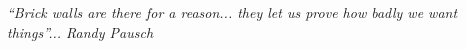 \documentclass[a4paper, 11pt, oneside]{Thesis}  %
\begin{document}
%
%
%
% 
% 
% 
% 
% 
% 
% 
% 

\pagestyle{empty}  %

\null\vfill
\textit{``Brick walls are there for a reason... they let us prove how badly we want things''... Randy Pausch}
%
\end{document}
